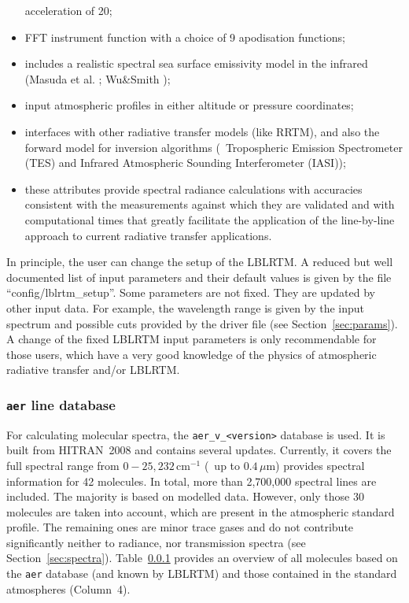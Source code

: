 \begin{itemize}
    acceleration of 20;
  \item FFT instrument function with a choice of 9 apodisation functions;
  \item includes a realistic spectral sea surface emissivity model in the
    infrared (Masuda et al. \cite{MAS88}; Wu\&Smith \cite{WUS97});
  \item input atmospheric profiles in either altitude or pressure coordinates;
  \item interfaces with other radiative transfer models (like RRTM), and also
    the forward model for inversion algorithms (\eg\ Tropospheric Emission
    Spectrometer (TES) and Infrared Atmospheric Sounding Interferometer
    (IASI));
  \item these attributes provide spectral radiance calculations with
    accuracies consistent with the measurements against which they are
    validated and with computational times that greatly facilitate the
    application of the line-by-line approach to current radiative transfer
    applications.
\end{itemize}

In principle, the user can change the setup of the \ac{LBLRTM}. A reduced but
well documented list of input parameters and their default values is given by
the file ``config/lblrtm\_setup''. Some parameters are not fixed. They are
updated by other input data. For example, the wavelength range is given by
the input spectrum and possible cuts provided by the driver file (see
Section~\ref{sec:params}). A change of the fixed \ac{LBLRTM} input parameters
is only recommendable for those users, which have a very good knowledge of the
physics of atmospheric radiative transfer and/or \ac{LBLRTM}.

\subsubsection{{\tt aer} line database}\label{sec:molecs}
For calculating molecular spectra, the {\tt aer\_v\_<version>} database
\cite{LBLRTM} is used. It is built from \ac{HITRAN}~2008 \cite{HITRAN} and
contains several updates. Currently, it covers the full spectral range from
$0 - 25,232$\,cm$^{-1}$ (\ie\ up to $0.4\,\mu$m) provides spectral information
for 42 molecules. In total, more than 2,700,000 spectral lines are included.
The majority is based on modelled data. However, only those 30 molecules are
taken into account, which are present in the atmospheric standard profile. The
remaining ones are minor trace gases and do not contribute significantly
neither to radiance, nor transmission spectra (see Section~\ref{sec:spectra}).
Table~\ref{sec:molecs} provides an overview of all molecules based on the
{\tt aer} database (and known by \ac{LBLRTM}) and those contained in the
standard atmospheres (Column~4).

